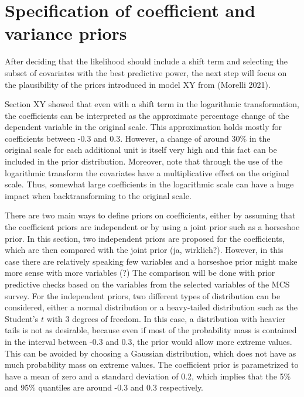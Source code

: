 \section{Specification of coefficient and variance priors}

After deciding that the likelihood should include a shift term and selecting the subset of covariates with the best predictive power, the next step will focus on the plausibility of the priors introduced in model XY from (Morelli 2021).

Section XY showed that even with a shift term in the logarithmic transformation, the coefficients can be interpreted as the approximate percentage change of the dependent variable in the original scale.
This approximation holds mostly for coefficients between -0.3 and 0.3.
However, a change of around 30\% in the original scale for each additional unit is itself very high and this fact can be included in the prior distribution.
Moreover, note that through the use of the logarithmic transform the covariates have a multiplicative effect on the original scale.
Thus, somewhat large coefficients in the logarithmic scale can have a huge impact when backtransforming to the original scale.

There are two main ways to define priors on coefficients, either by assuming that the coefficient priors are independent or by using a joint prior such as a horseshoe prior.
In this section, two independent priors are proposed for the coefficients, which are then compared with the joint prior (ja, wirklich?). However, in this case there are relatively speaking few variables and a horseshoe prior might make more sense with more variables (?)
The comparison will be done with prior predictive checks based on the variables from the selected variables of the MCS survey.
For the independent priors, two different types of distribution can be considered, either a normal distribution or a heavy-tailed distribution such as the Student's $t$ with 3 degrees of freedom.
In this case, a distribution with heavier tails is not as desirable, because even if most of the probability mass is contained in the interval between -0.3 and 0.3, the prior would allow more extreme values.
This can be avoided by choosing a Gaussian distribution, which does not have as much probability mass on extreme values.
The coefficient prior is parametrized to have a mean of zero and a standard deviation of 0.2, which implies that the 5\% and 95\% quantiles are around -0.3 and 0.3 respectively.

